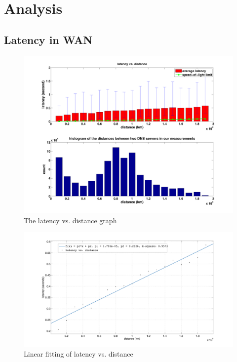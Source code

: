 \section{Analysis}
\label{sec:analysis}

\subsection{Latency in WAN}
\label{sec:latency-wan-1}

\begin{figure}
  \centering
  \includegraphics[width=\linewidth]{../figs/latency_dist.pdf}
  \caption{The latency vs. distance graph}
  \label{fig:latency_dist}
\end{figure}

\begin{figure}
  \centering
  \includegraphics[width=\linewidth]{../figs/fit_curve.pdf}
  \caption{Linear fitting of latency vs. distance}
  \label{fig:fit_curve}
\end{figure}

